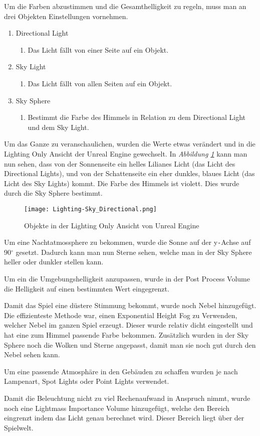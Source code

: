 Um die Farben abzustimmen und die Gesamthelligkeit zu regeln, muss man an drei Objekten Einstellungen vornehmen.
\begin{enumerate}
    \item Directional Light
    \begin{enumerate}
        \item Das Licht fällt von einer Seite auf ein Objekt.
    \end{enumerate}
    \item Sky Light
    \begin{enumerate}
        \item Das Licht fällt von allen Seiten auf ein Objekt.
    \end{enumerate}
    \item Sky Sphere
    \begin{enumerate}
        \item Bestimmt die Farbe des Himmels in Relation zu dem Directional Light und dem Sky Light.
    \end{enumerate}
\end{enumerate}

Um das Ganze zu veranschaulichen, wurden die Werte etwas verändert und in die Lighting Only Ansicht der Unreal Engine gewechselt.
In \textit{Abbildung \ref{lighting:Lighting-Sky_Directional}} kann man nun sehen,
dass von der Sonnenseite ein helles Lilianes Licht (das Licht des Directional Lights), und von der Schattenseite ein eher dunkles, blaues Licht
(das Licht des Sky Lights) kommt.
Die Farbe des Himmels ist violett. Dies wurde durch die Sky Sphere bestimmt.
\begin{figure}[h]
    \centering
    \texttt{[image: Lighting-Sky\_Directional.png]}
    \caption{Objekte in der Lighting Only Ansicht von Unreal Engine}
    \label{lighting:Lighting-Sky_Directional}
\end{figure}

Um eine Nachtatmossphere zu bekommen, wurde die Sonne auf der y\verb+-+Achse auf 90$^\circ$ gesetzt. Dadurch kann man nun Sterne sehen,
welche man in der Sky Sphere heller oder dunkler stellen kann.

Um ein die Umgebungshelligkeit anzupassen, wurde in der Post Process Volume die Helligkeit auf einen bestimmten Wert eingegrenzt.

Damit das Spiel eine düstere Stimmung bekommt, wurde noch Nebel hinzugefügt. Die effizienteste Methode war, einen Exponential Height Fog zu Verwenden, welcher
Nebel im ganzen Spiel erzeugt. Dieser wurde relativ dicht eingestellt und hat eine zum Himmel passende Farbe bekommen. Zusätzlich wurden in der Sky Sphere noch die Wolken
und Sterne angepasst, damit man sie noch gut durch den Nebel sehen kann.

Um eine passende Atmosphäre in den Gebäuden zu schaffen wurden je nach Lampenart, Spot Lights oder Point Lights verwendet.

Damit die Beleuchtung nicht zu viel Rechenaufwand in Anspruch nimmt, wurde noch eine Lightmass Importance Volume hinzugefügt, welche den Bereich eingrenzt
indem das Licht genau berechnet wird. Dieser Bereich liegt über der Spielwelt.

